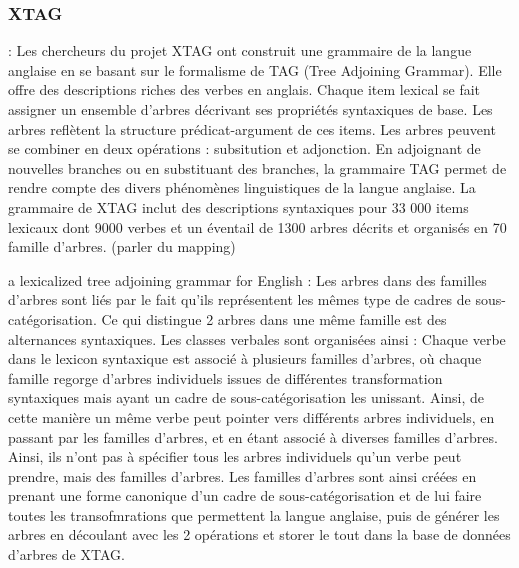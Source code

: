 \subsubsection{XTAG} : Les chercheurs du projet XTAG ont construit une grammaire de la langue anglaise en se basant sur le formalisme de TAG (Tree Adjoining Grammar). Elle offre des descriptions riches des verbes en anglais. Chaque item lexical se fait assigner un ensemble d'arbres décrivant ses propriétés syntaxiques de base. Les arbres reflètent la structure prédicat-argument de ces items. Les arbres peuvent se combiner en deux opérations : subsitution et adjonction. En adjoignant de nouvelles branches ou en substituant des branches, la grammaire TAG permet de rendre compte des divers phénomènes linguistiques de la langue anglaise. La grammaire de XTAG inclut des descriptions syntaxiques pour 33 000 items lexicaux dont 9000 verbes et un éventail de 1300 arbres décrits et organisés en 70 famille d'arbres.
(parler du mapping)

a lexicalized tree adjoining grammar for English \citep{ResearchGroupLexicalizedTreeAdjoining2001} : Les arbres dans des familles d'arbres sont liés par le fait qu'ils représentent les mêmes type de cadres de sous-catégorisation. Ce qui distingue 2 arbres dans une même famille est des alternances syntaxiques. Les classes verbales sont organisées ainsi : Chaque verbe dans le lexicon syntaxique est associé à plusieurs familles d'arbres, où chaque famille regorge d'arbres individuels issues de différentes transformation syntaxiques mais ayant un cadre de sous-catégorisation les unissant. Ainsi, de cette manière un même verbe peut pointer vers différents arbres individuels, en passant par les familles d'arbres, et en étant associé à diverses familles d'arbres. Ainsi, ils n'ont pas à spécifier tous les arbres individuels qu'un verbe peut prendre, mais des familles d'arbres. Les familles d'arbres sont ainsi créées en prenant une forme canonique d'un cadre de sous-catégorisation et de lui faire toutes les transofmrations que permettent la langue anglaise, puis de générer les arbres en découlant avec les 2 opérations et storer le tout dans la base de données d'arbres de XTAG.

